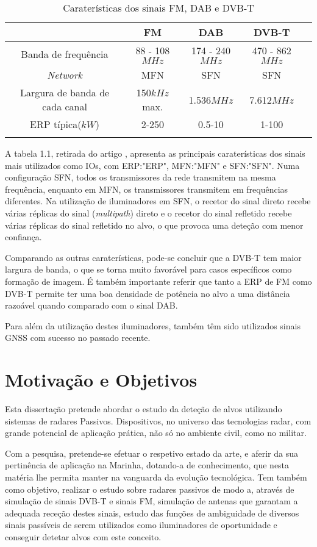 \begin{table}[h]
\centering
\begin{tabular}{@{}ccccc@{}}
\toprule
                    	 & FM                & DAB     & DVB-T     \\ \midrule
Banda de frequência      & 88 - 108$MHz$   & 174 - 240$MHz$  & 470 - 862$MHz$           \\
\textit{Network}    			 & MFN   & SFN   & SFN \\
Largura de banda de cada canal    & 150$kHz$ max.      & 1.536$MHz$  & 7.612$MHz$   \\ 
ERP típica($kW$)      & 2-250         & 0.5-10    & 1-100            \\ \bottomrule
\label{tab:cara}
\end{tabular}
\caption[Caraterísticas dos sinais FM, DAB e DVB-T]{Caraterísticas dos sinais FM, DAB e DVB-T \parencite{HeinerKuschel2019}}
\end{table} 
\par
A tabela 1.1, retirada do artigo \cite{HeinerKuschel2019}, apresenta as principais caraterísticas dos sinais mais utilizados como \gls{IO}s, com ERP:"\gls{ERP}", MFN:"\gls{MFN}" e SFN:"\gls{SFN}". Numa configuração \gls{SFN}, todos os transmissores da rede transmitem na mesma frequência, enquanto em \gls{MFN}, os transmissores transmitem em frequências diferentes. Na utilização de iluminadores em \gls{SFN}, o recetor do sinal direto recebe várias réplicas do sinal (\textit{multipath}) direto e o recetor do sinal refletido recebe várias réplicas do sinal refletido no alvo, o que provoca uma deteção com menor confiança.\par 
Comparando as outras caraterísticas, pode-se concluir que a \gls{DVB-T} tem maior largura de banda, o que se torna muito favorável para casos específicos como formação de imagem. É também importante referir que tanto a \gls{ERP} de \gls{FM} como \gls{DVB-T} permite ter uma boa densidade de potência no alvo a uma distância razoável quando comparado com o sinal \gls{DAB}.\par 
Para além da utilização destes iluminadores, também têm sido utilizados sinais \gls{GNSS} com sucesso no passado recente.

\section{Motivação e Objetivos}
Esta dissertação pretende abordar o estudo da deteção de alvos utilizando sistemas de radares Passivos. Dispositivos, no universo das tecnologias radar, com grande potencial de aplicação prática, não só no ambiente civil, como no militar.\par
Com a pesquisa, pretende-se efetuar o respetivo estado da arte, e aferir da sua pertinência de aplicação na Marinha, dotando-a de conhecimento, que nesta matéria lhe permita manter na vanguarda da evolução tecnológica. Tem também como objetivo, realizar o estudo sobre radares passivos de modo a, através de simulação de sinais \gls{DVB-T} e sinais \gls{FM}, simulação de antenas que garantam a adequada receção destes sinais, estudo das funções de ambiguidade de diversos sinais passíveis de serem utilizados como iluminadores de oportunidade e conseguir detetar alvos com este conceito. 


